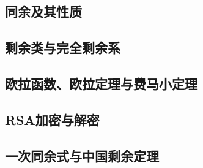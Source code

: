 \subsection{同余及其性质}
\label{sec:congruences-and-its-properties}

\subsection{剩余类与完全剩余系}
\label{sec:residue-and-complete-set-of-residues}

\subsection{欧拉函数、欧拉定理与费马小定理}
\label{sec:euler-function-and-euler-theorem-and-fermat-small-theorem}

\subsection{RSA加密与解密}
\label{sec:rsa-encrypt-decrypt}

\subsection{一次同余式与中国剩余定理}
\label{sec:congruence-of-first-degree-and-chinese-remainder-theorem}


